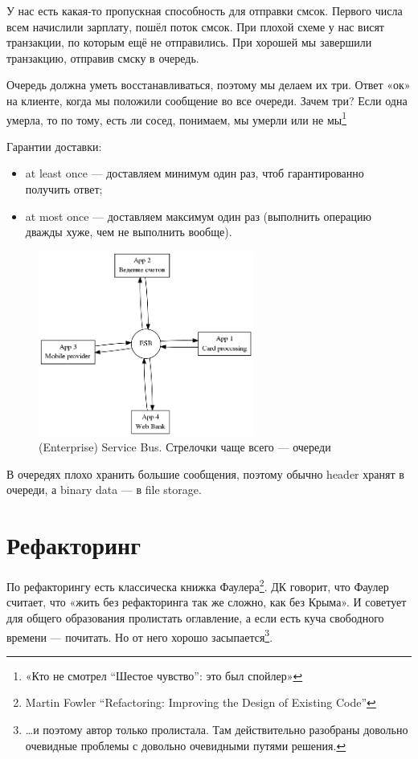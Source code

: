 \documentclass[11pt,a4paper]{article}
\begin{document}
У нас есть какая-то пропускная способность для отправки смсок. Первого числа всем начислили зарплату, пошёл поток смсок. При плохой схеме у нас висят транзакции, по которым ещё не отправились. При хорошей мы завершили транзакцию, отправив смску в очередь.

Очередь должна уметь восстанавливаться, поэтому мы делаем их три. Ответ «ок» на клиенте, когда мы положили сообщение во все очереди. Зачем три? Если одна умерла, то по тому, есть ли сосед, понимаем, мы умерли или не мы\footnote{«Кто не смотрел ``Шестое чувство'': это был спойлер»}

Гарантии доставки:
\begin{itemize}
\item at least once — доставляем минимум один раз, чтоб гарантированно получить ответ;
\item at most once — доставляем максимум один раз (выполнить операцию дважды хуже, чем не выполнить вообще).
\end{itemize}

\begin{figure}[H]
	\centering
	\includegraphics[width=200pt]{pics/bus.png}
	\caption{(Enterprise) Service Bus. Стрелочки чаще всего — очереди}
\end{figure}

В очередях плохо хранить большие сообщения, поэтому обычно header хранят в очереди, а binary data — в file storage.

\section{Рефакторинг}
По рефакторингу есть классическа книжка Фаулера\footnote{Martin Fowler ``Refactoring: Improving the Design of Existing Code''}. ДК говорит, что Фаулер считает, что «жить без рефакторинга так же сложно, как без Крыма». И советует для общего образования пролистать оглавление, а если есть куча свободного времени — почитать. Но от него хорошо засыпается\footnote{…и поэтому автор только пролистала. Там действительно разобраны довольно очевидные проблемы с довольно очевидными путями решения.}.
\end{document}
